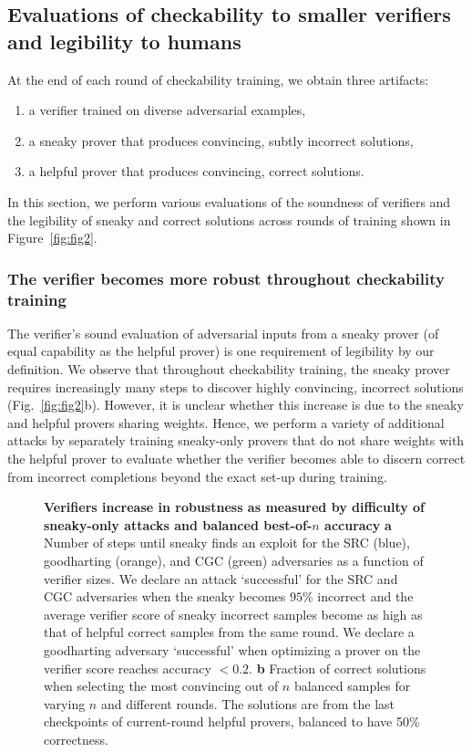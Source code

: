 \documentclass{article}
\begin{document}
\subsection{Evaluations of checkability to smaller verifiers and legibility to humans}

At the end of each round of checkability training, we obtain three artifacts:
\begin{enumerate}
    \item a verifier trained on diverse adversarial examples,
    \item a sneaky prover that produces convincing, subtly incorrect solutions,
    \item a helpful prover that produces convincing, correct solutions.
\end{enumerate}
In this section, we perform various evaluations of the soundness of verifiers and the legibility of sneaky and correct solutions across rounds of training shown in Figure~\ref{fig:fig2}.

\subsubsection{The verifier becomes more robust throughout checkability training}
\label{sec:offline_eval}

The verifier's sound evaluation of adversarial inputs from a sneaky prover (of equal capability as the helpful prover) is one requirement of legibility by our definition. We observe that throughout checkability training, the sneaky prover requires increasingly many steps to discover highly convincing, incorrect solutions (Fig.~\ref{fig:fig2}b). However, it is unclear whether this increase is due to the sneaky and helpful provers sharing weights. Hence, we perform a variety of additional attacks by separately training sneaky-only provers that do not share weights with the helpful prover to evaluate whether the verifier becomes able to discern correct from incorrect completions beyond the exact set-up during training.

\begin{figure}
    \centering
    \caption{\textbf{Verifiers increase in robustness as measured by difficulty of sneaky-only attacks and balanced best-of-$n$ accuracy} \textbf{a} Number of steps until sneaky finds an exploit for the SRC (blue), goodharting (orange), and CGC (green) adversaries as a function of verifier sizes. We declare an attack `successful' for the SRC and CGC adversaries when the sneaky becomes $95\%$ incorrect and the average verifier score of sneaky incorrect samples become as high as that of helpful correct samples from the same round. We declare a goodharting adversary `successful' when optimizing a prover on the verifier score reaches accuracy $<0.2$. \textbf{b} Fraction of correct solutions when selecting the most convincing out of $n$ balanced samples for varying $n$ and different rounds. The solutions are from the last checkpoints of current-round helpful provers, balanced to have 50\% correctness.}
    \label{fig:offline_eval}
\end{figure}
\end{document}
